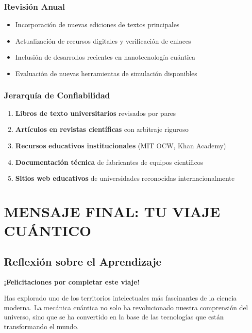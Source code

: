 \begin{tecnologiabox}
\begin{tecnologiabox}
\begin{tecnologiabox}
\subsection{Revisión Anual}

\begin{itemize}
	\item Incorporación de nuevas ediciones de textos principales
	\item Actualización de recursos digitales y verificación de enlaces
	\item Inclusión de desarrollos recientes en nanotecnología cuántica
	\item Evaluación de nuevas herramientas de simulación disponibles
\end{itemize}

\subsection{Jerarquía de Confiabilidad}

\begin{enumerate}
	\item \textbf{Libros de texto universitarios} revisados por pares
	\item \textbf{Artículos en revistas científicas} con arbitraje riguroso
	\item \textbf{Recursos educativos institucionales} (MIT OCW, Khan Academy)
	\item \textbf{Documentación técnica} de fabricantes de equipos científicos
	\item \textbf{Sitios web educativos} de universidades reconocidas internacionalmente
\end{enumerate}

\chapter{MENSAJE FINAL: TU VIAJE CUÁNTICO}

\section{Reflexión sobre el Aprendizaje}

\begin{consejobox}
	\textbf{¡Felicitaciones por completar este viaje!}
	
	Has explorado uno de los territorios intelectuales más fascinantes de la ciencia moderna. La mecánica cuántica no solo ha revolucionado nuestra comprensión del universo, sino que se ha convertido en la base de las tecnologías que están transformando el mundo.
\end{consejobox}


\end{tecnologiabox}
\end{tecnologiabox}
\end{tecnologiabox}

